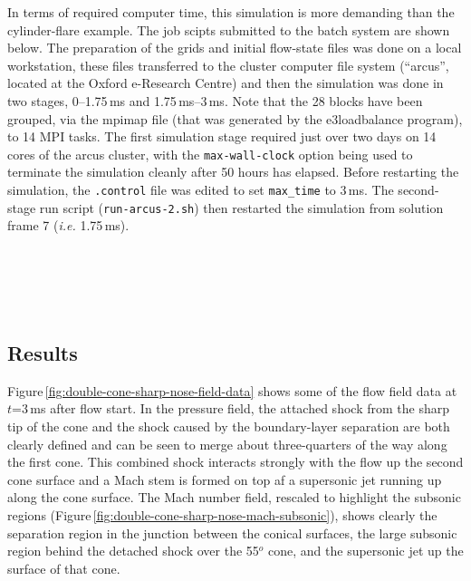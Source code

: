 \medskip
In terms of required computer time, this simulation is more demanding than the cylinder-flare example.
The job scipts submitted to the batch system are shown below.
The preparation of the grids and initial flow-state files was done on a local workstation, 
these files transferred to the cluster computer file system (``arcus'', located at the Oxford e-Research Centre)
and then the simulation was done in two stages, 
0--1.75\,ms and 1.75\,ms--3\,ms.
Note that the 28 blocks have been grouped, via the mpimap file 
(that was generated by the e3loadbalance program), to 14 MPI tasks.
The first simulation stage required just over two days on 14 cores of the arcus cluster,
with the \verb!max-wall-clock! option being used to terminate the simulation cleanly after 50 hours
has elapsed.
Before restarting the simulation, the \verb!.control! file was edited to set \verb!max_time! to 3\,ms.
The second-stage run script (\verb!run-arcus-2.sh!) then restarted the simulation from solution frame 7 
(\textit{i.e.} 1.75\,ms).

\noindent
\topbar
{}
\bottombar\\
\topbar
{}
\bottombar\\
\topbar

\bottombar\\

\clearpage
\subsection{Results}
%
Figure\,\ref{fig:double-cone-sharp-nose-field-data} shows some of the flow field data at $t$=3\,ms after flow start.
In the pressure field, the attached shock from the sharp tip of the cone and the shock 
caused by the boundary-layer separation 
are both clearly defined and can be seen to merge about three-quarters of the way along the first cone.
This combined shock interacts strongly with the flow up the second cone surface and a Mach stem is formed 
on top af a supersonic jet running up along the cone surface.
The Mach number field, rescaled to highlight the subsonic regions 
(Figure\,\ref{fig:double-cone-sharp-nose-mach-subsonic}), shows clearly the separation region in the
junction between the conical surfaces, the large subsonic region behind the detached shock over the 55$^o$ cone, 
and the supersonic jet up the surface of that cone.

